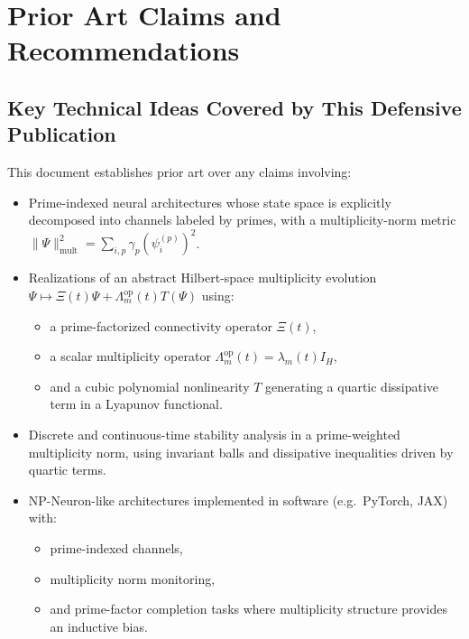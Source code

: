 \documentclass[11pt]{article}
\begin{document}
\section{Prior Art Claims and Recommendations}

\subsection{Key Technical Ideas Covered by This Defensive Publication}

This document establishes prior art over any claims involving:

\begin{itemize}[leftmargin=*]
  \item Prime-indexed neural architectures whose state space is explicitly decomposed into channels labeled by primes, with a multiplicity-norm metric \(\|\Psi\|_{\mathrm{mult}}^2 = \sum_{i,p} \gamma_p (\psi_i^{(p)})^2\).

  \item Realizations of an abstract Hilbert-space multiplicity evolution
  \(\Psi \mapsto \Xi(t)\Psi + \Lambda_m^{\mathrm{op}}(t)T(\Psi)\)
  using:
  \begin{itemize}
    \item a prime-factorized connectivity operator \(\Xi(t)\),
    \item a scalar multiplicity operator \(\Lambda_m^{\mathrm{op}}(t) = \lambda_m(t) I_H\),
    \item and a cubic polynomial nonlinearity \(T\) generating a quartic dissipative term in a Lyapunov functional.
  \end{itemize}

  \item Discrete and continuous-time stability analysis in a prime-weighted multiplicity norm, using invariant balls and dissipative inequalities driven by quartic terms.

  \item NP-Neuron-like architectures implemented in software (e.g.\ PyTorch, JAX) with:
  \begin{itemize}
    \item prime-indexed channels,
    \item multiplicity norm monitoring,
    \item and prime-factor completion tasks where multiplicity structure provides an inductive bias.
  \end{itemize}
\end{itemize}
\end{document}
